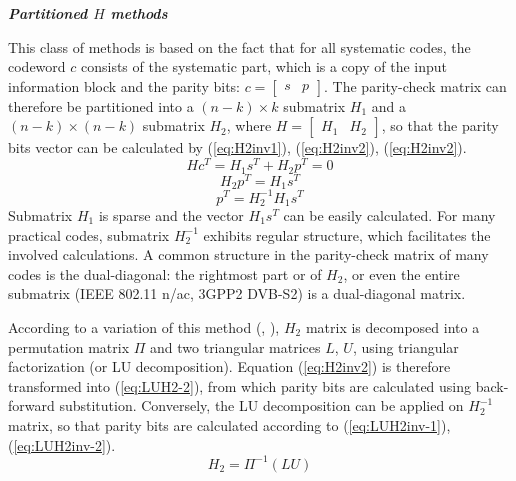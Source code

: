 \textbf{\textit{Partitioned $H$ methods}}\par
This class of methods is based on the fact that for all systematic codes, the codeword $c$ consists of the systematic part, which is a copy of the input information block and the parity bits: $c=\begin{bmatrix}s & p\end{bmatrix}$. The parity-check matrix can therefore be partitioned into a $(n-k)\times k$ submatrix $H_{1}$ and a $(n-k) \times (n-k)$ submatrix $H_{2}$, where $H=\begin{bmatrix}H_{1} & H_{2}\end{bmatrix}$, so that the parity bits vector can be calculated by (\ref{eq:H2inv1}), (\ref{eq:H2inv2}), (\ref{eq:H2inv2}).
    \begin{equation}
        Hc^{T}=H_{1}s^{T}+H_{2}p^{T}=0
        \label{eq:H2inv1}
    \end{equation}
    \begin{equation}
        H_{2}p^{T}=H_{1}s^{T}
        \label{eq:H2inv2}
    \end{equation}
    \begin{equation}
        p^{T}=H_{2}^{-1}H_{1}s^{T}
        \label{eq:H2inv3}
    \end{equation}
Submatrix $H_1$ is sparse and the vector $H_{1}s^{T}$ can be easily calculated. For many practical codes, submatrix $H_{2}^{-1}$ exhibits regular structure, which facilitates the involved calculations. A common structure in the parity-check matrix of many codes is the dual-diagonal: the rightmost part or of $H_{2}$, or even the entire submatrix (IEEE 802.11 n/ac, 3GPP2 DVB-S2) is a dual-diagonal matrix. \par
According to a variation of this method (\cite{Jia-ningSu2005}, \cite{Kaji2006}), $H_2$ matrix is decomposed into a permutation matrix $\Pi$ and two triangular matrices $L$, $U$, using triangular factorization (or LU decomposition).  Equation (\ref{eq:H2inv2}) is therefore transformed into (\ref{eq:LUH2-2}), from which parity bits are calculated using back-forward substitution. Conversely, the LU decomposition can be applied on $H_{2}^{-1}$ matrix, so that parity bits are calculated according to (\ref{eq:LUH2inv-1}),(\ref{eq:LUH2inv-2}).
                \begin{equation}        
                        H_{2}=\Pi^{-1}(LU)              
                        \label{eq:LUH2-1}
                 \end{equation}                                          
